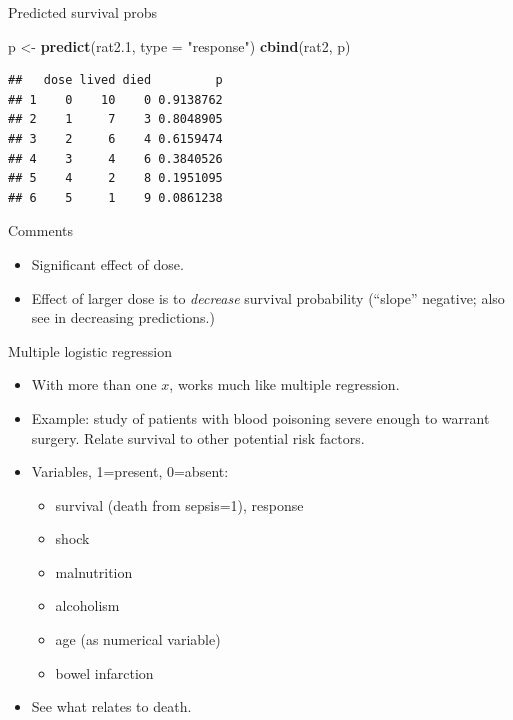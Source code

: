 \documentclass[ignorenonframetext,]{beamer}
\newenvironment{Shaded}{\begin{snugshade}}{\end{snugshade}}
\newcommand{\DataTypeTok}[1]{\textcolor[rgb]{0.13,0.29,0.53}{#1}}
\newcommand{\FloatTok}[1]{\textcolor[rgb]{0.00,0.00,0.81}{#1}}
\newcommand{\KeywordTok}[1]{\textcolor[rgb]{0.13,0.29,0.53}{\textbf{#1}}}
\newcommand{\NormalTok}[1]{#1}
\newcommand{\StringTok}[1]{\textcolor[rgb]{0.31,0.60,0.02}{#1}}
\providecommand{\tightlist}{%
  \setlength{\itemsep}{0pt}\setlength{\parskip}{0pt}}
\begin{document}
\begin{frame}[fragile]{Predicted survival probs}
\protect\hypertarget{predicted-survival-probs}{}

\begin{Shaded}
\begin{Highlighting}[]
\NormalTok{p <-}\StringTok{ }\KeywordTok{predict}\NormalTok{(rat2}\FloatTok{.1}\NormalTok{, }\DataTypeTok{type =} \StringTok{"response"}\NormalTok{)}
\KeywordTok{cbind}\NormalTok{(rat2, p)}
\end{Highlighting}
\end{Shaded}

\begin{verbatim}
##   dose lived died         p
## 1    0    10    0 0.9138762
## 2    1     7    3 0.8048905
## 3    2     6    4 0.6159474
## 4    3     4    6 0.3840526
## 5    4     2    8 0.1951095
## 6    5     1    9 0.0861238
\end{verbatim}

\end{frame}

\begin{frame}{Comments}
\protect\hypertarget{comments-10}{}

\begin{itemize}
\item
  Significant effect of dose.
\item
  Effect of larger dose is to \emph{decrease} survival probability
  (``slope'' negative; also see in decreasing predictions.)
\end{itemize}

\end{frame}

\begin{frame}{Multiple logistic regression}
\protect\hypertarget{multiple-logistic-regression}{}

\begin{itemize}
\item
  With more than one \(x\), works much like multiple regression.
\item
  Example: study of patients with blood poisoning severe enough to
  warrant surgery. Relate survival to other potential risk factors.
\item
  Variables, 1=present, 0=absent:

  \begin{itemize}
  \tightlist
  \item
    survival (death from sepsis=1), response
  \item
    shock
  \item
    malnutrition
  \item
    alcoholism
  \item
    age (as numerical variable)
  \item
    bowel infarction
  \end{itemize}
\item
  See what relates to death.
\end{itemize}

\end{frame}
\end{document}
